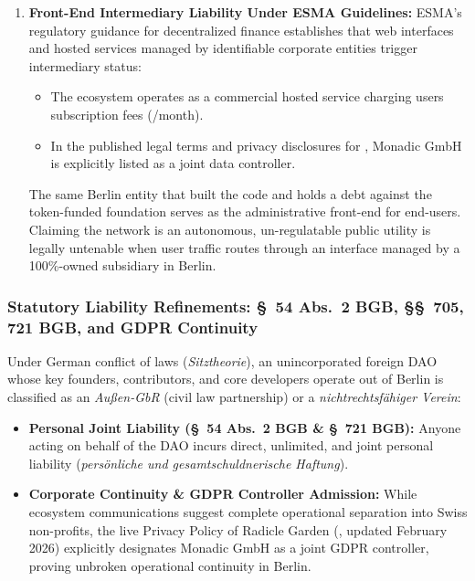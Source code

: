 \documentclass[a4paper,11pt,twoside,parskip=half-,headings=small]{scrartcl}
\begin{document}
\begin{enumerate}
\begin{itemize}
  \end{itemize}
  \item \textbf{Front-End Intermediary Liability Under ESMA Guidelines:} ESMA's regulatory guidance for decentralized finance establishes that web interfaces and hosted services managed by identifiable corporate entities trigger intermediary status:
  \begin{itemize}
    \item The ecosystem operates  as a commercial hosted service charging users subscription fees (/month).
    \item In the published legal terms and privacy disclosures for , Monadic GmbH is explicitly listed as a joint data controller.
  \end{itemize}
  The same Berlin entity that built the code and holds a  debt against the token-funded foundation serves as the administrative front-end for end-users. Claiming the network is an autonomous, un-regulatable public utility is legally untenable when user traffic routes through an interface managed by a 100\%-owned subsidiary in Berlin.
\end{enumerate}

\subsubsection{Statutory Liability Refinements: \S~54 Abs.~2 BGB, \S\S~705, 721 BGB, and GDPR Continuity}
\label{sec:bgb_liability_gdpr}

Under German conflict of laws (\emph{Sitztheorie}), an unincorporated foreign DAO whose key founders, contributors, and core developers operate out of Berlin is classified as an \emph{Außen-GbR} (civil law partnership) or a \emph{nichtrechtsfähiger Verein}:
\begin{itemize}[nosep]
  \item \textbf{Personal Joint Liability (\S~54 Abs.~2 BGB \& \S~721 BGB):} Anyone acting on behalf of the DAO incurs direct, unlimited, and joint personal liability (\emph{persönliche und gesamtschuldnerische Haftung}).
  \item \textbf{Corporate Continuity \& GDPR Controller Admission:} While ecosystem communications suggest complete operational separation into Swiss non-profits, the live Privacy Policy of Radicle Garden (, updated February 2026) explicitly designates Monadic GmbH as a joint GDPR controller, proving unbroken operational continuity in Berlin.
\end{itemize}
\end{document}

